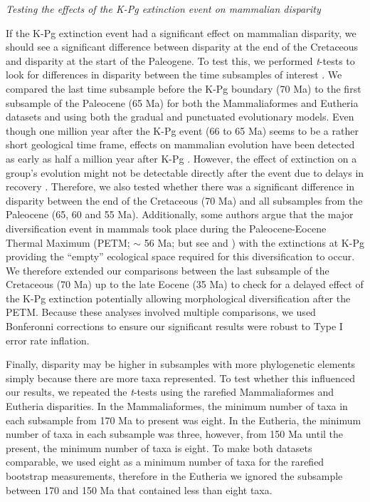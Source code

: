 \documentclass[12pt,letterpaper]{article}
\renewcommand{\subsection}[1]{%
\bigskip
\begin{center}
\begin{large}
\normalfont\itshape #1
\end{large}
\end{center}}
\begin{document}
\subsection{Testing the effects of the K-Pg extinction event on mammalian disparity}
If the K-Pg extinction event had a significant effect on mammalian disparity, we should see a significant difference between disparity at the end of the Cretaceous and disparity at the start of the Paleogene.
To test this, we performed \textit{t}-tests to look for differences in disparity between the time subsamples of interest \citep[e.g. as used in][]{anderson2012using,zelditch2012geometric,smith2014joined}.
We compared the last time subsample before the K-Pg boundary (70 Ma) to the first subsample of the Paleocene (65 Ma) for both the Mammaliaformes and Eutheria datasets and using both the gradual and punctuated evolutionary models.
Even though one million year after the K-Pg event (66 to 65 Ma) seems to be a rather short geological time frame, effects on mammalian evolution have been detected as early as half a million year after K-Pg \citep{Wilson2013}.
However, the effect of extinction on a group's evolution might not be detectable directly after the event due to delays in recovery \citep[e.g.][estimated that ecosystems only fully recovered 8-9 Ma after the Permo-Triassic mass extinction]{chen2012timing}.
Therefore, we also tested whether there was a significant difference in disparity between the end of the Cretaceous (70 Ma) and all subsamples from the Paleocene (65, 60 and 55 Ma).
Additionally, some authors argue that the major diversification event in mammals took place during the Paleocene-Eocene Thermal Maximum (PETM; $\sim$ 56 Ma; \citealt{bininda2007delayed} but see \citealt{meredithimpacts2011} and \citealt{Stadler12042011}) with the extinctions at K-Pg providing the ``empty'' ecological space required for this diversification to occur.
We therefore extended our comparisons between the last subsample of the Cretaceous (70 Ma) up to the late Eocene (35 Ma) to check for a delayed effect of the K-Pg extinction potentially allowing morphological diversification after the PETM. 
Because these analyses involved multiple comparisons, we used Bonferonni corrections \citep{holm1979simple} to ensure our significant results were robust to Type I error rate inflation. 

Finally, disparity may be higher in subsamples with more phylogenetic elements simply because there are more taxa represented.
To test whether this influenced our results, we repeated the \textit{t}-tests using the rarefied Mammaliaformes and Eutheria disparities.
In the Mammaliaformes, the minimum number of taxa in each subsample from 170 Ma to present was eight.
In the Eutheria, the minimum number of taxa in each subsample was three, however, from 150 Ma until the present, the minimum number of taxa is eight.
To make both datasets comparable, we used eight as a minimum number of taxa for the rarefied bootstrap measurements, therefore in the Eutheria we ignored the subsample between 170 and 150 Ma that contained less than eight taxa.
\end{document}
